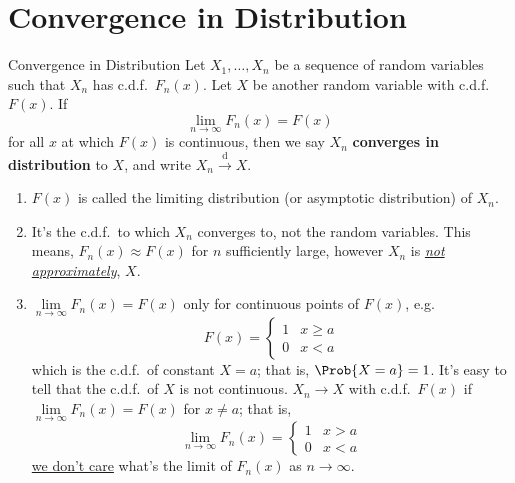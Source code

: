 \section{Convergence in Distribution}
\begin{Definition}{Convergence in Distribution}{}
    Let $ X_1,\ldots,X_n $ be a sequence of random variables
    such that $ X_n $ has c.d.f.\ $ F_n(x) $. Let $ X $
    be another random variable with c.d.f.\ $ F(x) $.
    If
    \[ \lim\limits_{{n} \to {\infty}} F_n(x)=F(x) \]
    for all $ x $ at which $ F(x) $ is continuous, then
    we say $ X_n $ \textbf{converges in distribution}
    to $ X $, and write $ X_n\stackrel{\text{d}}{\to} X $.
\end{Definition}
\begin{Remark}{}{}
    \begin{enumerate}[label=(\roman*)]
        \item $ F(x) $ is called the limiting distribution
              (or asymptotic distribution) of $ X_n $.
        \item It's the c.d.f.\ to which $ X_n $ converges to,
              not the random variables. This means,
              $ F_n(x)\approx F(x) $ for $ n $ sufficiently large,
              however $ X_n $ is \underline{\emph{not approximately}},
              $ X $.
        \item $ \lim\limits_{{n} \to {\infty}} F_n(x)=F(x) $
              only for continuous points of $ F(x) $, e.g.\
              \[ F(x)=\begin{cases}
                      1 & x\ge a \\
                      0 & x<a
                  \end{cases} \]
              which is the c.d.f.\
              of constant $ X=a $; that is,
              $ \Prob{X=a}=1 $. It's easy to tell that the
              c.d.f.\ of $ X $ is not continuous.
              $ X_n\to X $ with c.d.f.\ $ F(x) $ if
              $ \lim\limits_{{n} \to {\infty}} F_n(x)=F(x) $
              for $ x\neq a $; that is,
              \[ \lim\limits_{{n} \to {\infty}} F_n(x)=
                  \begin{cases}
                      1 & x>a \\
                      0 & x<a
                  \end{cases} \]
              \underline{we don't care} what's the limit of
              $ F_n(x) $ as $ n\to\infty $.
    \end{enumerate}
\end{Remark}
